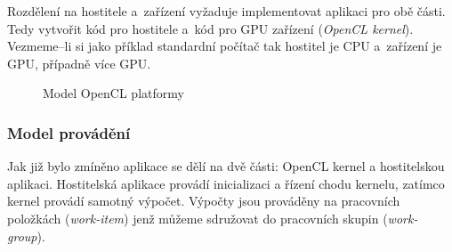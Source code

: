  Rozdělení na hostitele a~zařízení vyžaduje implementovat aplikaci pro obě části. Tedy
vytvořit kód pro hostitele a~kód pro GPU zařízení ({\it OpenCL kernel}). Vezmeme--li si jako
příklad standardní počítač tak hostitel je CPU a~zařízení je GPU, případně více GPU.
\begin{figure}[ht]
    \begin{center}
    \end{center}
    \caption{Model OpenCL platformy \cite{Khronos:2015}}
    \label{platform}
\end{figure}
\subsubsection{Model provádění}
Jak již bylo zmíněno aplikace se dělí na dvě části: OpenCL kernel a hostitelskou aplikaci.
Hostitelská aplikace provádí inicializaci a řízení chodu kernelu, zatímco kernel provádí samotný
výpočet. Výpočty jsou prováděny na pracovních položkách ({\it work-item}) jenž můžeme sdružovat do
pracovních skupin ({\it work-group}).

